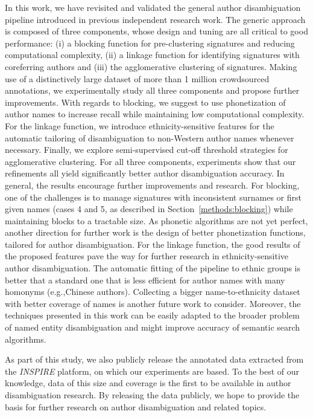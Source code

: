 \documentclass[runningheads,a4paper]{llncs}
\makeatletter
\newcommand*{\eg}{e.g.\@\xspace}
\newcommand{\verylongpage}{\enlargethispage{2\baselineskip}}
\makeatother
\begin{document}
In this work, we have revisited and validated the general author disambiguation
pipeline introduced in previous independent research work.
The generic approach is composed of three components, whose design and tuning are all critical
to good performance: (i) a blocking function for pre-clustering signatures
and reducing computational complexity, (ii) a linkage function for identifying
signatures with coreferring authors and (iii) the agglomerative clustering of
signatures. Making use of a distinctively large dataset of more than 1 million
crowdsourced annotations, we experimentally study all three components and
propose further improvements. With regards to blocking, we suggest to use
phonetization of author names to increase recall while maintaining low
computational complexity. For the linkage function, we introduce
ethnicity-sensitive features for the automatic tailoring of disambiguation to non-Western
author names whenever necessary. Finally, we explore semi-supervised cut-off
threshold strategies for agglomerative clustering. For all three components,
experiments show that our refinements all yield significantly better author
disambiguation accuracy.
In general, the results encourage further improvements and research. For blocking, one of the challenges is to manage signatures with inconsistent surnames or first given names (cases 4 and 5, as described in Section~\ref{methods:blocking}) while maintaining blocks to a tractable size. As phonetic algorithms are not yet perfect, another direction  for further work is the design of better phonetization functions, tailored for author disambiguation. For the linkage function, the good results of the proposed features pave the way for further research in ethnicity-sensitive author disambiguation. The automatic fitting of the pipeline to ethnic groups is better that a standard one that is less efficient for author names with many homonyms (\eg,Chinese authors). Collecting a bigger name-to-ethnicity dataset with better coverage of names is another future work to consider.
Moreover, the techniques presented in this work can be easily adapted to the broader
problem of named entity disambiguation and might improve accuracy of semantic search
algorithms.

As part of this study, we also publicly release the annotated data extracted
from the \emph{INSPIRE} platform, on which our experiments are based.
To the best of our knowledge, data of this size and coverage is the first to be
available in author disambiguation research. By releasing the data publicly,
we hope to provide the basis for further research on author disambiguation
and related topics.

\verylongpage



\end{document}
